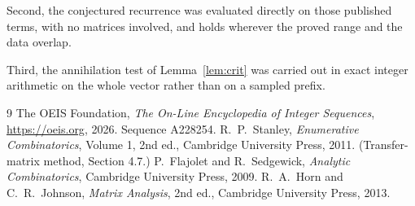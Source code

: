 \documentclass[11pt,a4paper]{article}
\theoremstyle{plain}
\theoremstyle{definition}
\begin{document}
Second, the conjectured recurrence was evaluated directly on those published terms, with no
matrices involved, and holds wherever the proved range and the data overlap.

Third, the annihilation test of Lemma~\ref{lem:crit} was carried out in exact integer
arithmetic on the whole vector rather than on a sampled prefix.

\begin{thebibliography}{9}
 The OEIS Foundation, \emph{The On-Line Encyclopedia of Integer
Sequences}, \url{https://oeis.org}, 2026. Sequence A228254.
 R.~P.~Stanley, \emph{Enumerative Combinatorics}, Volume 1, 2nd ed.,
Cambridge University Press, 2011. (Transfer-matrix method, Section 4.7.)
 P.~Flajolet and R.~Sedgewick, \emph{Analytic Combinatorics}, Cambridge
University Press, 2009.
 R.~A.~Horn and C.~R.~Johnson, \emph{Matrix Analysis}, 2nd ed., Cambridge
University Press, 2013.
\end{thebibliography}
\end{document}
